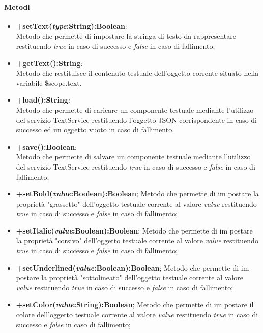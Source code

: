 	\paragraph{Metodi}
	\begin{itemize}
	\item \textbf{+setText(\textit{type}:String):Boolean}:\\
		Metodo che permette di impostare la stringa di testo da rappresentare restituendo \textit{true} in caso di successo e \textit{false} in caso di fallimento;
	\item \textbf{+getText():String}:\\
		Metodo che restituisce il contenuto testuale dell'oggetto corrente situato nella variabile \$scope.text.
	\item \textbf{+load():String}:\\	
		Metodo che permette di caricare un componente testuale mediante l'utilizzo del servizio TextService restituendo l'oggetto JSON corrispondente in caso di successo ed un oggetto vuoto in caso di fallimento.	
	\item \textbf{+save():Boolean}:\\	
			Metodo che permette di salvare un componente testuale mediante l'utilizzo del servizio TextService restituendo \textit{true} in caso di successo e \textit{false} in caso di fallimento;
	\item \textbf{+setBold(\textit{value}:Boolean):Boolean};
		Metodo che permette di im postare la proprietà "grassetto" dell'oggetto testuale corrente al valore \textit{value} restituendo \textit{true} in caso di successo e \textit{false} in caso di fallimento;
	\item \textbf{+setItalic(\textit{value}:Boolean):Boolean};
		Metodo che permette di im postare la proprietà "corsivo" dell'oggetto testuale corrente al valore \textit{value} restituendo \textit{true} in caso di successo e \textit{false} in caso di fallimento;
	\item \textbf{+setUnderlined(\textit{value}:Boolean):Boolean};
		Metodo che permette di im postare la proprietà "sottolineato" dell'oggetto testuale corrente al valore \textit{value} restituendo \textit{true} in caso di successo e \textit{false} in caso di fallimento;
	\item \textbf{+setColor(\textit{value}:String):Boolean};
			Metodo che permette di im postare il colore dell'oggetto testuale corrente al valore \textit{value} restituendo \textit{true} in caso di successo e \textit{false} in caso di fallimento;
	
	\end{itemize}
